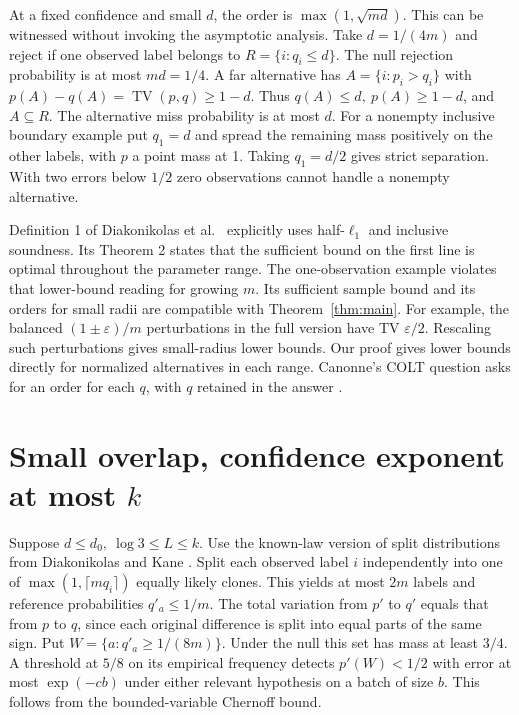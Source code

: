 \documentclass[11pt]{article}
\newcommand{\TV}{\operatorname{TV}}
\begin{document}
At a fixed confidence and small \(d\), the order is \(\max(1,\sqrt{md})\). This can be witnessed without invoking the asymptotic analysis. Take \(d=1/(4m)\) and reject if one observed label belongs to \(R=\{i:q_i\le d\}\). The null rejection probability is at most \(md=1/4\). A far alternative has \(A=\{i:p_i>q_i\}\) with \(p(A)-q(A)=\TV(p,q)\ge1-d\). Thus \(q(A)\le d,\ p(A)\ge1-d\), and \(A\subseteq R\). The alternative miss probability is at most \(d\). For a nonempty inclusive boundary example put \(q_1=d\) and spread the remaining mass positively on the other labels, with \(p\) a point mass at 1. Taking \(q_1=d/2\) gives strict separation. With two errors below \(1/2\) zero observations cannot handle a nonempty alternative.

Definition 1 of Diakonikolas et al.\ \cite{dgpp} explicitly uses half-\(\ell_1\) and inclusive soundness. Its Theorem 2 states that the sufficient bound on the first line is optimal throughout the parameter range. The one-observation example violates that lower-bound reading for growing \(m\). Its sufficient sample bound and its orders for small radii are compatible with Theorem~\ref{thm:main}. For example, the balanced \((1\pm\varepsilon)/m\) perturbations in the full version have TV \(\varepsilon/2\). Rescaling such perturbations gives small-radius lower bounds. Our proof gives lower bounds directly for normalized alternatives in each range. Canonne's COLT question asks for an order for each \(q\), with \(q\) retained in the answer \cite{canonne}.

\section{Small overlap, confidence exponent at most \(k\)}
Suppose \(d\le d_0,\ \log 3\le L\le k\). Use the known-law version of split distributions from Diakonikolas and Kane \cite{split}. Split each observed label \(i\) independently into one of \(\max(1,\lceil m q_i\rceil)\) equally likely clones. This yields at most \(2m\) labels and reference probabilities \(q'_a\le1/m\). The total variation from \(p'\) to \(q'\) equals that from \(p\) to \(q\), since each original difference is split into equal parts of the same sign. Put \(W=\{a:q'_a\ge1/(8m)\}\). Under the null this set has mass at least \(3/4\). A threshold at \(5/8\) on its empirical frequency detects \(p'(W)<1/2\) with error at most \(\exp(-c b)\) under either relevant hypothesis on a batch of size \(b\). This follows from the bounded-variable Chernoff bound.
\end{document}
